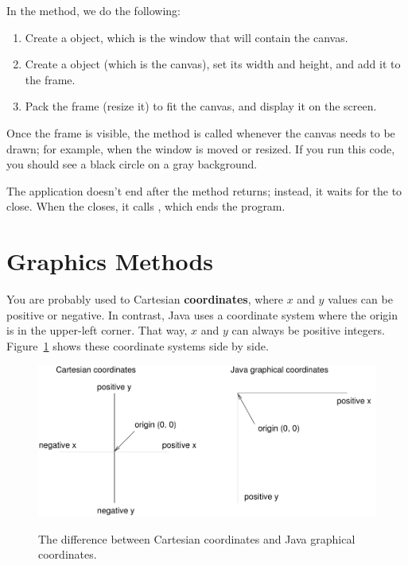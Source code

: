 
In the  method, we do the following:

\begin{enumerate}

\item Create a  object, which is the window that will contain the canvas.

\item Create a  object (which is the canvas), set its width and height, and add it to the frame.

\item Pack the frame (resize it) to fit the canvas, and display it on the screen.
\end{enumerate}


Once the frame is visible, the  method is called whenever the canvas needs to be drawn; for example, when the window is moved or resized.
If you run this code, you should see a black circle on a gray background.

The application doesn't end after the  method returns; instead, it waits for the  to close.
When the  closes, it calls , which ends the program.

\section{Graphics Methods}


You are probably used to Cartesian {\bf coordinates}, where $x$ and $y$ values can be positive or negative.
In contrast, Java uses a coordinate system where the origin is in the upper-left corner.
That way, $x$ and $y$ can always be positive integers.
Figure~\ref{fig.coordinates} shows these coordinate systems side by side.

\begin{figure}[!ht]
\begin{center}
\includegraphics[width=5in,alt={Diagram comparing Cartesian coordinate system with origin at center and Java graphics coordinate system with origin at upper-left corner, showing how y-axis is inverted}]{figs/coordinates.pdf}
\caption{The difference between Cartesian coordinates and Java graphical coordinates.}
\label{fig.coordinates}
\end{center}
\end{figure}

